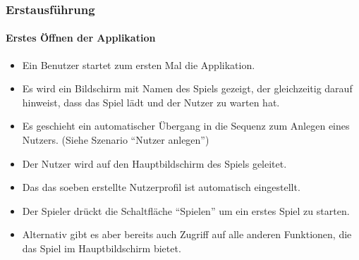 \subsubsection{Erstausführung}
\paragraph{Erstes Öffnen der Applikation}\mbox{}\newline
\begin{itemize}
\item Ein Benutzer startet zum ersten Mal die Applikation. 
\item Es wird ein Bildschirm mit Namen des Spiels gezeigt, der gleichzeitig darauf
hinweist, dass das Spiel lädt und der Nutzer zu warten hat.
\item Es geschieht ein automatischer Übergang in die Sequenz zum
Anlegen eines Nutzers. \newline (Siehe Szenario ``Nutzer anlegen'')
\item Der Nutzer wird auf den Hauptbildschirm des Spiels geleitet. 
\item Das das soeben erstellte Nutzerprofil ist automatisch eingestellt.
\item Der Spieler drückt die Schaltfläche ``Spielen'' um ein erstes Spiel zu starten.
\item Alternativ gibt es aber bereits auch Zugriff auf alle anderen Funktionen,
die das Spiel im Hauptbildschirm bietet.
\end{itemize}

